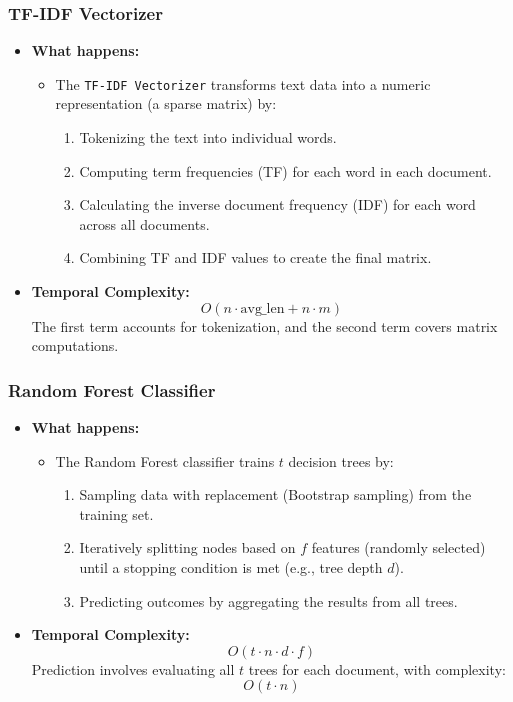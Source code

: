 \documentclass[runningheads,a4paper,11pt]{report}
\begin{document}
\subsubsection{TF-IDF Vectorizer}
\label{section:vectorizer}
\begin{itemize}
  \item \textbf{What happens:}
  \begin{itemize}
    \item The \texttt{TF-IDF Vectorizer} transforms text data into a numeric representation (a sparse matrix) by:
    \begin{enumerate}
      \item Tokenizing the text into individual words.
      \item Computing term frequencies (TF) for each word in each document.
      \item Calculating the inverse document frequency (IDF) for each word across all documents.
      \item Combining TF and IDF values to create the final matrix.
    \end{enumerate}
  \end{itemize}
  \item \textbf{Temporal Complexity:}
  \[
  O(n \cdot \text{avg\_len} + n \cdot m)
  \]
  The first term accounts for tokenization, and the second term covers matrix computations.
\end{itemize}

\subsubsection{Random Forest Classifier}
\label{section:forest-classifier}
\begin{itemize}
  \item \textbf{What happens:}
  \begin{itemize}
    \item The Random Forest classifier trains $t$ decision trees by:
    \begin{enumerate}
      \item Sampling data with replacement (Bootstrap sampling) from the training set.
      \item Iteratively splitting nodes based on $f$ features (randomly selected) until a stopping condition is met (e.g., tree depth $d$).
      \item Predicting outcomes by aggregating the results from all trees.
    \end{enumerate}
  \end{itemize}
  \item \textbf{Temporal Complexity:}
  \[
  O(t \cdot n \cdot d \cdot f)
  \]
  Prediction involves evaluating all $t$ trees for each document, with complexity:
  \[
  O(t \cdot n)
  \]
\end{itemize}
\end{document}

